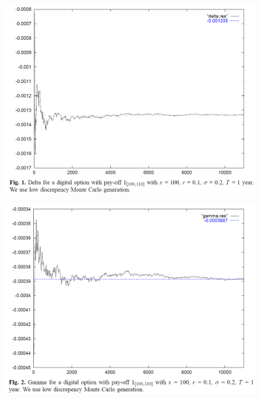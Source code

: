 \documentclass{beamer}
\begin{document}
\begin{frame}
  \begin{figure}
  \centering
  \includegraphics[scale=0.3]{fig1_fournie_99_malliavin_mc.png}\\
\end{figure}
\end{frame}

\begin{frame}
  \begin{figure}
  \centering
  \includegraphics[scale=0.3]{fig2_fournie_99_malliavin_mc.png}\\
\end{figure}
\end{frame}
\end{document}
